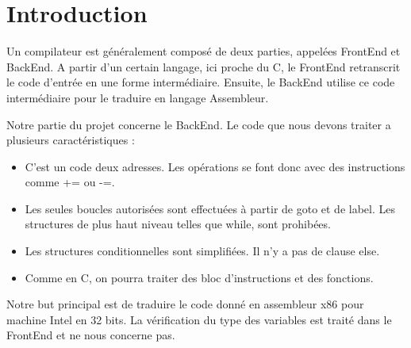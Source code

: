 \section*{Introduction}

Un compilateur est généralement composé de deux parties, appelées FrontEnd et BackEnd. A partir d'un certain langage, ici proche du C, le FrontEnd retranscrit le code d'entrée en une forme intermédiaire. Ensuite, le BackEnd utilise ce code intermédiaire pour le traduire en langage Assembleur. 

Notre partie du projet concerne le BackEnd. 
Le code que nous devons traiter a plusieurs caractéristiques :
\begin{itemize}
\item C'est un code deux adresses. Les opérations se font donc avec des instructions comme += ou -=. 
\item Les seules boucles autorisées sont effectuées à partir de goto et de label. Les structures de plus haut niveau telles que while, sont prohibées.
\item Les structures conditionnelles sont simplifiées. Il n'y a pas de clause else.
\item Comme en C, on pourra traiter des bloc d'instructions et des fonctions.
\end{itemize}

Notre but principal est de traduire le code donné en assembleur x86 pour machine Intel en 32 bits. La vérification du type des variables est traité dans le FrontEnd et ne nous concerne pas.